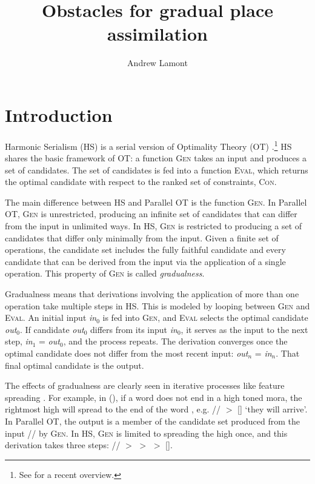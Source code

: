 \documentclass[output=paper]{LSP/langsci}
\author{Andrew Lamont\affiliation{University of Massachusetts, Amherst}}
\title{Obstacles for gradual place assimilation}
\begin{document}
\maketitle

\section{Introduction}

Harmonic Serialism (HS) is a serial version of Optimality Theory (OT) \citep[\textit{et seq.}]{princesmolensky1993,mccarthy2000}.\footnote{See \citet{mccarthy2016} for a recent overview.} HS shares the basic framework of OT: a function \textsc{Gen} takes an input and produces a set of candidates. The set of candidates is fed into a function \textsc{Eval}, which returns the optimal candidate with respect to the ranked set of constraints, \textsc{Con}.

The main difference between HS and Parallel OT is the function \textsc{Gen}. In Parallel OT, \textsc{Gen} is unrestricted, producing an infinite set of candidates that can differ from the input in unlimited ways. In HS, \textsc{Gen} is restricted to producing a set of candidates that differ only minimally from the input. Given a finite set of operations, the candidate set includes the fully faithful candidate and every candidate that can be derived from the input via the application of a single operation. This property of \textsc{Gen} is called \textit{gradualness}.

Gradualness means that derivations involving the application of more than one operation take multiple steps in HS. This is modeled by looping between \textsc{Gen} and \textsc{Eval}. An initial input \textit{in$_0$} is fed into \textsc{Gen}, and \textsc{Eval} selects the optimal candidate \textit{out$_0$}. If candidate \textit{out$_0$} differs from its input \textit{in$_0$}, it serves as the input to the next step, \textit{in$_1$} = \textit{out$_0$}, and the process repeats. The derivation converges once the optimal candidate does not differ from the most recent input: \textit{out$_n$} = \textit{in$_n$}. That final optimal candidate is the output.

The effects of gradualness are clearly seen in iterative processes like feature spreading \citep{mccarthy2009}. For example, in  (), if a word does not end in a high toned mora, the rightmost high  will spread to the end of the word \citep{kulabickmore2015}, e.g. // $>$ [] `they will arrive'. In Parallel OT, the output \textit{} is a member of the candidate set produced from the input // by \textsc{Gen}. In HS, \textsc{Gen} is limited to spreading the high  once, and this derivation takes three steps: // $>$  $>$  $>$ []. 
\end{document}
